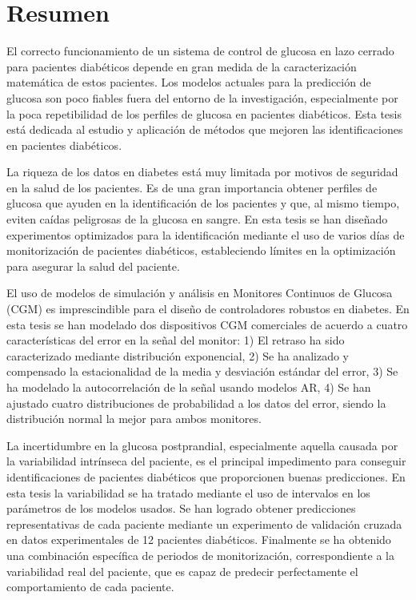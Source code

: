\chapter*{Resumen}
\label{sec:Resumen}


El correcto funcionamiento de un sistema de control de glucosa en lazo cerrado para pacientes diab\'{e}ticos depende en gran medida de la caracterizaci\'{o}n matem\'{a}tica de estos pacientes. Los modelos actuales para la predicci\'{o}n de glucosa son poco fiables fuera del entorno de la investigaci\'{o}n, especialmente por la poca repetibilidad de los perfiles de glucosa en pacientes diab\'{e}ticos. Esta tesis est\'{a} dedicada al estudio y aplicaci\'{o}n de m\'{e}todos que mejoren las identificaciones en pacientes diab\'{e}ticos.

La riqueza de los datos en diabetes est\'{a} muy limitada por motivos de seguridad en la salud de los pacientes. Es de una gran importancia obtener perfiles de glucosa que ayuden en la identificaci\'{o}n de los pacientes y que, al mismo tiempo, eviten ca\'{i}das peligrosas de la glucosa en sangre. En esta tesis se han dise\~{n}ado experimentos optimizados para la identificaci\'{o}n mediante el uso de varios d\'{i}as de monitorizaci\'{o}n de pacientes diab\'{e}ticos, estableciendo l\'{i}mites en la optimizaci\'{o}n para asegurar la salud del paciente.

El uso de modelos de simulaci\'{o}n y an\'{a}lisis en Monitores Continuos de Glucosa (CGM) es imprescindible para el dise\~{n}o de controladores robustos en diabetes. En esta tesis se han modelado dos dispositivos CGM comerciales de acuerdo a cuatro caracter\'{i}sticas del error en la se\~{n}al del monitor: 1) El retraso ha sido caracterizado mediante distribuci\'{o}n exponencial, 2) Se ha analizado y compensado la estacionalidad de la media y desviaci\'{o}n est\'{a}ndar del error, 3) Se ha modelado la autocorrelaci\'{o}n de la se\~{n}al usando modelos AR, 4) Se han ajustado cuatro distribuciones de probabilidad a los datos del error, siendo la distribuci\'{o}n normal la mejor para ambos monitores.

La incertidumbre en la glucosa postprandial, especialmente aquella causada por la variabilidad intr\'{i}nseca del paciente, es el principal impedimento para conseguir identificaciones de pacientes diab\'{e}ticos que proporcionen buenas predicciones. En esta tesis la variabilidad se ha tratado mediante el uso de intervalos en los par\'{a}metros de los modelos usados. Se han logrado obtener predicciones representativas de cada paciente mediante un experimento de validaci\'{o}n cruzada en datos experimentales de 12 pacientes diab\'{e}ticos. Finalmente se ha obtenido una combinaci\'{o}n espec\'{i}fica de periodos de monitorizaci\'{o}n, correspondiente a la variabilidad real del paciente, que es capaz de predecir perfectamente el comportamiento de cada paciente.

